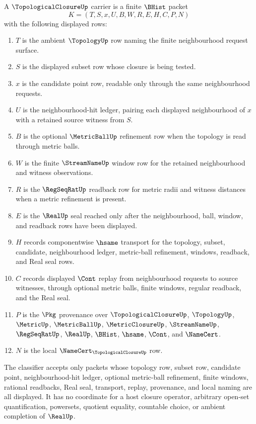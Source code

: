 \begin{definition}
\label{def:topological-closure-carrier}
A $\TopologicalClosureUp$ carrier is a finite $\BHist$ packet
$$
K=(T,S,x,U,B,W,R,E,H,C,P,N)
$$
with the following displayed rows:
\begin{enumerate}
\item $T$ is the ambient $\TopologyUp$ row naming the finite neighbourhood request surface.
\item $S$ is the displayed subset row whose closure is being tested.
\item $x$ is the candidate point row, readable only through the same neighbourhood requests.
\item $U$ is the neighbourhood-hit ledger, pairing each displayed neighbourhood of $x$ with a retained source witness from $S$.
\item $B$ is the optional $\MetricBallUp$ refinement row when the topology is read through metric balls.
\item $W$ is the finite $\StreamNameUp$ window row for the retained neighbourhood and witness observations.
\item $R$ is the $\RegSeqRatUp$ readback row for metric radii and witness distances when a metric refinement is present.
\item $E$ is the $\RealUp$ seal reached only after the neighbourhood, ball, window, and readback rows have been displayed.
\item $H$ records componentwise $\hsame$ transport for the topology, subset, candidate, neighbourhood ledger, metric-ball refinement, windows, readback, and Real seal rows.
\item $C$ records displayed $\Cont$ replay from neighbourhood requests to source witnesses, through optional metric balls, finite windows, regular readback, and the Real seal.
\item $P$ is the $\Pkg$ provenance over $\TopologicalClosureUp$, $\TopologyUp$, $\MetricUp$, $\MetricBallUp$, $\MetricClosureUp$, $\StreamNameUp$, $\RegSeqRatUp$, $\RealUp$, $\BHist$, $\hsame$, $\Cont$, and $\NameCert$.
\item $N$ is the local $\NameCert_{\TopologicalClosureUp}$ row.
\end{enumerate}
The classifier accepts only packets whose topology row, subset row, candidate point, neighbourhood-hit ledger, optional metric-ball refinement, finite windows, rational readbacks, Real seal, transport, replay, provenance, and local naming are all displayed. It has no coordinate for a host closure operator, arbitrary open-set quantification, powersets, quotient equality, countable choice, or ambient completion of $\RealUp$.
\end{definition}


